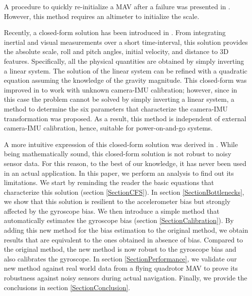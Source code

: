 \documentclass[letterpaper, 10 pt, conference]{ieeeconf}  %
\begin{document}


A procedure to quickly re-initialize a MAV after a failure was presented in \cite{Faessler2015}.
However, this method requires an altimeter to initialize the scale.

Recently, a closed-form solution has been introduced in \cite{Martinelli2012}.
From integrating inertial and visual measurements over a short time-interval, this solution provides the absolute scale, roll and pitch angles, initial velocity, and distance to 3D features.
Specifically, all the physical quantities are obtained by simply inverting a linear system.
The solution of the linear system can be refined with a quadratic equation assuming the knowledge of the gravity magnitude.
This closed-form was improved in \cite{DongSi2012} to work with unknown camera-IMU calibration;
however, since in this case the problem cannot be solved by simply inverting a linear system, a method to determine the six parameters that characterize the camera-IMU transformation was proposed.
As a result, this method is independent of external camera-IMU calibration, hence, suitable for power-on-and-go systems.

A more intuitive expression of this closed-form solution was derived in \cite{Martinelli2014}.
While being mathematically sound, this closed-form solution is not robust to noisy sensor data.
For this reason, to the best of our knowledge, it has never been used in an actual application.
In this paper, we perform an analysis to find out its limitations. We start by reminding the reader the basic equations that characterize this solution (section \ref{SectionCFS}).
In section \ref{SectionBottlenecks}, we show that this solution is resilient to the accelerometer bias but strongly affected by the gyroscope bias.
We then introduce a simple method that automatically estimates the gyroscope bias (section \ref{SectionCalibration}).
By adding this new method for the bias estimation to the original method, we obtain results that are equivalent to the ones obtained in absence of bias.
Compared to the original method, the new method is now robust to the gyroscope bias and also calibrates the gyroscope.
In section \ref{SectionPerformance}, we validate our new method against real world data from a flying quadrotor MAV to prove its robustness against noisy sensors during actual navigation.
Finally, we provide the conclusions in section \ref{SectionConclusion}.
\end{document}
